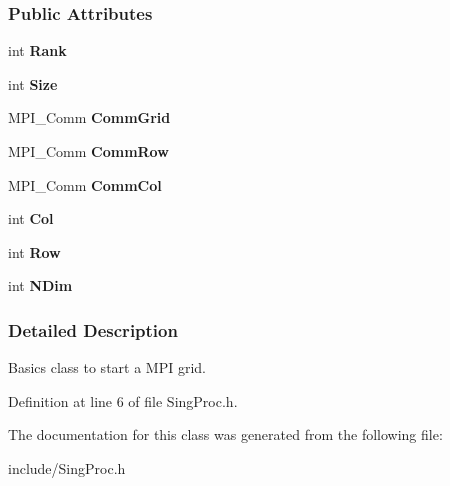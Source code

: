 \subsubsection*{Public Attributes}
\begin{DoxyCompactItemize}
\item 
int {\bfseries Rank}\hypertarget{classSingProc_aa8e7eb314f63a9383edcce8e38694e90}{}\label{classSingProc_aa8e7eb314f63a9383edcce8e38694e90}

\item 
int {\bfseries Size}\hypertarget{classSingProc_af06eb7b9b70be91dadd4f12ebcaed796}{}\label{classSingProc_af06eb7b9b70be91dadd4f12ebcaed796}

\item 
M\+P\+I\+\_\+\+Comm {\bfseries Comm\+Grid}\hypertarget{classSingProc_a82958d6e31776bbd7372475bad0a9f09}{}\label{classSingProc_a82958d6e31776bbd7372475bad0a9f09}

\item 
M\+P\+I\+\_\+\+Comm {\bfseries Comm\+Row}\hypertarget{classSingProc_ae3301d00b08296cfab4ad4301bda81fa}{}\label{classSingProc_ae3301d00b08296cfab4ad4301bda81fa}

\item 
M\+P\+I\+\_\+\+Comm {\bfseries Comm\+Col}\hypertarget{classSingProc_a3cc77c5d3c39f52babcd8b280a934833}{}\label{classSingProc_a3cc77c5d3c39f52babcd8b280a934833}

\item 
int {\bfseries Col}\hypertarget{classSingProc_a17362b2621c297f5be786e321d787063}{}\label{classSingProc_a17362b2621c297f5be786e321d787063}

\item 
int {\bfseries Row}\hypertarget{classSingProc_a389e27ee83b4a5d0eec4e321f4b2fe38}{}\label{classSingProc_a389e27ee83b4a5d0eec4e321f4b2fe38}

\item 
int {\bfseries N\+Dim}\hypertarget{classSingProc_a3b5e7568c0a268ec8bbeef7f29ea111a}{}\label{classSingProc_a3b5e7568c0a268ec8bbeef7f29ea111a}

\end{DoxyCompactItemize}


\subsubsection{Detailed Description}
Basics class to start a M\+PI grid. 

Definition at line 6 of file Sing\+Proc.\+h.



The documentation for this class was generated from the following file\+:\begin{DoxyCompactItemize}
\item 
include/Sing\+Proc.\+h\end{DoxyCompactItemize}

